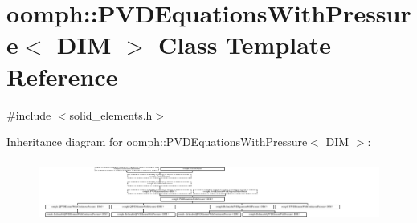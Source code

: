 \hypertarget{classoomph_1_1PVDEquationsWithPressure}{}\section{oomph\+:\+:P\+V\+D\+Equations\+With\+Pressure$<$ D\+IM $>$ Class Template Reference}
\label{classoomph_1_1PVDEquationsWithPressure}


{\ttfamily \#include $<$solid\+\_\+elements.\+h$>$}

Inheritance diagram for oomph\+:\+:P\+V\+D\+Equations\+With\+Pressure$<$ D\+IM $>$\+:\begin{figure}[H]
\begin{center}
\leavevmode
\includegraphics[height=2.020618cm]{classoomph_1_1PVDEquationsWithPressure}
\end{center}
\end{figure}
